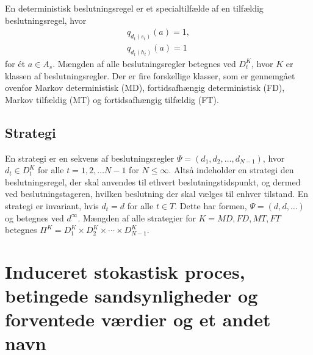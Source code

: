 En deterministisk beslutningsregel er et specialtilfælde af en tilfældig beslutningsregel, hvor 
\begin{align*}
    q_{d_t(s_t)}(a)=1,\\
    q_{d_t(h_t)}(a)=1
\end{align*}
for ét $a\in A_s$. Mængden af alle beslutningsregler betegnes ved $D_t^K$, hvor $K$ er klassen af beslutningsregler. Der er fire forskellige klasser, som er gennemgået ovenfor Markov deterministisk (MD), fortidsafhængig deterministisk (FD), Markov tilfældig (MT) og fortidsafhængig tilfældig (FT). 

\subsection{Strategi}
En strategi er en sekvens af beslutningsregler $\Psi=(d_1,d_2,\dots,d_{N-1})$, hvor $d_t\in D_t^K$ for alle $t=1, 2, \dots N-1$ for $N \leq \infty$. Altså indeholder en strategi den beslutningsregel, der skal anvendes til ethvert beslutningstidspunkt, og dermed ved beslutningstageren, hvilken beslutning der skal vælges til enhver tilstand. En strategi er invariant, hvis $d_t=d$ for alle $t\in T$. Dette har formen, $\Psi=(d,d,\dots)$ og betegnes ved $d^\infty$. 
Mængden af alle strategier for $K=MD, FD, MT, FT$ betegnes $\Pi^K=D_1^K\times D_2^K\times \cdots\times D_{N-1}^K$.



\section{Induceret stokastisk proces, betingede sandsynligheder og forventede værdier og et andet navn}



